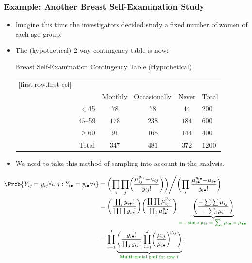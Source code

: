 \documentclass[oneside]{book}\usepackage[]{graphicx}\usepackage[svgnames]{xcolor}
\providecommand\given{} %
\renewcommand\given{\nonscript\:\delimsize\vert\nonscript\:\mathopen{}}%
\renewcommand\given{\nonscript\:\delimsize\vert\nonscript\:\mathopen{}}%
\renewcommand\given{\nonscript\:\delimsize\vert\nonscript\:\mathopen{}}%
\renewcommand\given{\nonscript\:\delimsize\vert\nonscript\:\mathopen{}}%
\renewcommand\given{\nonscript\:\delimsize\vert\nonscript\:\mathopen{}}%
\renewcommand\given{\nonscript\:\delimsize\vert\nonscript\:\mathopen{}}%
\renewcommand\given{\nonscript\:\delimsize\vert\nonscript\:\mathopen{}}%
\renewcommand\given{\nonscript\:\delimsize\vert\nonscript\:\mathopen{}}%
\renewcommand\given{\nonscript\:\delimsize\vert\nonscript\:\mathopen{}}%
\renewcommand\given{\nonscript\:\delimsize\vert\nonscript\:\mathopen{}}%
\renewcommand\given{\nonscript\:\delimsize\vert\nonscript\:\mathopen{}}%
\renewcommand\given{\nonscript\:\delimsize\vert\nonscript\:\mathopen{}}%
\let\exp\relax%
\renewcommand\given{:}
\begin{document}
\subsubsection*{Example: Another Breast Self-Examination Study}
\begin{itemize}
    \item Imagine this time the investigators decided study a fixed number of women of
          each age group.
    \item The (hypothetical) 2-way contingency table is now:
          \begin{Example}{Breast Self-Examination Contingency Table (Hypothetical)}
              \begin{center}
                  \begin{NiceTabular}{c|ccc|c}[first-row,first-col]
                      &&\\
                      && Monthly & Occasionally & Never & Total\\
                      \midrule
                       & $<$45 & $ 78 $ & $ 78 $ & $ 44 $ & $ 200 $\\
                      & 45--59 & $ 178 $ & $ 238 $ & $ 184 $ & $ 600 $\\
                      & $ \ge $60 & $ 91 $ & $ 165 $ & $ 144 $ & $ 400 $\\
                      \midrule
                      & Total & $ 347 $ & $ 481 $ & $ 372 $ & $ 1200 $
                  \end{NiceTabular}
              \end{center}
          \end{Example}
    \item We need to take this method of sampling into account in the analysis.
\end{itemize}
\begin{align*}
    \Prob{Y_{ij}=y_{ij}\forall i,j\given Y_{i\bullet}=y_{i\bullet}\forall i}
     & =\biggl(\prod_i \prod_j \biggl(\frac{\mu_{ij}^{y_{ij}} \exp{-\mu_{ij}}}{y_{ij}!}\biggr)\biggr)\Bigg/\biggl(\prod_i \frac{\mu_{i\bullet}^{y_{i\bullet}}\exp{-\mu_{i\bullet}}}{y_{i\bullet}!}\biggr)             \\
     & =\biggl(\frac{\prod_i y_{i\bullet}!}{\prod\prod y_{ij}!}\biggr)\biggl(\frac{\prod\prod \mu_{ij}^{y_{ij}}}{\prod_i \mu_{i\bullet}^{y_{i\bullet}}}\biggr)
    \underbrace{\biggl(\frac{\exp{-\sum\sum \mu_{ij}}}{\exp{-\sum_i \mu_i}}\biggr)}_{\textcolor{Green}{\text{$=1$ since $\mu_{i j}=\sum_i \mu_{i\bullet}=\mu_{\bullet\bullet}$ }}}                                    \\
     & =\prod_{i=1}^I \underbrace{\biggl(\frac{y_{i\bullet}!}{\prod_j y_{ij}!}\prod_{j=1}^J \biggl(\frac{\mu_{ij}}{\mu_{i\bullet}}\biggr)^{\!y_{ij}}\biggr)}_{\textcolor{Green}{\text{Multinomial pmf for row $i$}}}.
\end{align*}
\end{document}

